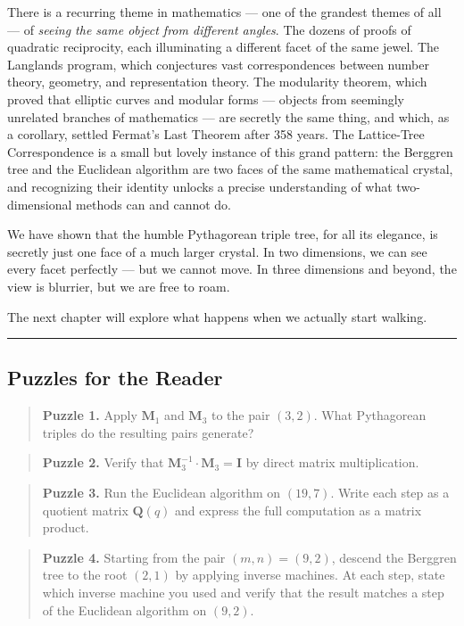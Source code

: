 There is a recurring theme in mathematics --- one of the grandest themes of all --- of \emph{seeing the same object from different angles}. The dozens of proofs of quadratic reciprocity, each illuminating a different facet of the same jewel. The Langlands program, which conjectures vast correspondences between number theory, geometry, and representation theory. The modularity theorem, which proved that elliptic curves and modular forms --- objects from seemingly unrelated branches of mathematics --- are secretly the same thing, and which, as a corollary, settled Fermat's Last Theorem after 358 years. The Lattice-Tree Correspondence is a small but lovely instance of this grand pattern: the Berggren tree and the Euclidean algorithm are two faces of the same mathematical crystal, and recognizing their identity unlocks a precise understanding of what two-dimensional methods can and cannot do.

We have shown that the humble Pythagorean triple tree, for all its elegance, is secretly just one face of a much larger crystal. In two dimensions, we can see every facet perfectly --- but we cannot move. In three dimensions and beyond, the view is blurrier, but we are free to roam.

The next chapter will explore what happens when we actually start walking.

\bigskip\noindent\rule{\linewidth}{0.4pt}\bigskip

\subsection{Puzzles for the Reader}
\begin{quote}
\textbf{Puzzle 1.} Apply \(\mathbf{M}_1\) and \(\mathbf{M}_3\) to the pair \((3, 2)\). What Pythagorean triples do the resulting pairs generate?
\end{quote}

\begin{quote}
\textbf{Puzzle 2.} Verify that \(\mathbf{M}_3^{-1} \cdot \mathbf{M}_3 = \mathbf{I}\) by direct matrix multiplication.
\end{quote}

\begin{quote}
\textbf{Puzzle 3.} Run the Euclidean algorithm on \((19, 7)\). Write each step as a quotient matrix \(\mathbf{Q}(q)\) and express the full computation as a matrix product.
\end{quote}

\begin{quote}
\textbf{Puzzle 4.} Starting from the pair \((m, n) = (9, 2)\), descend the Berggren tree to the root \((2, 1)\) by applying inverse machines. At each step, state which inverse machine you used and verify that the result matches a step of the Euclidean algorithm on \((9, 2)\).
\end{quote}

